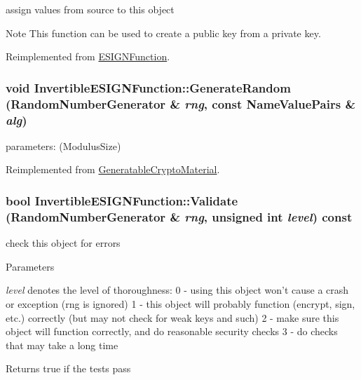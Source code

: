 assign values from source to this object \begin{DoxyNote}{Note}
This function can be used to create a public key from a private key. 
\end{DoxyNote}


Reimplemented from \hyperlink{class_e_s_i_g_n_function_a1ff8229ed7786a13a69d15e5a64e4d21}{ESIGNFunction}.\hypertarget{class_invertible_e_s_i_g_n_function_a241b733193f9f420f188ca6f57d49c27}{
\subsubsection[{GenerateRandom}]{\setlength{\rightskip}{0pt plus 5cm}void InvertibleESIGNFunction::GenerateRandom ({\bf RandomNumberGenerator} \& {\em rng}, \/  const {\bf NameValuePairs} \& {\em alg})}}
\label{class_invertible_e_s_i_g_n_function_a241b733193f9f420f188ca6f57d49c27}
parameters: (ModulusSize) 

Reimplemented from \hyperlink{class_generatable_crypto_material_abe368b52db1ca7079b690f2d6e605f7a}{GeneratableCryptoMaterial}.\hypertarget{class_invertible_e_s_i_g_n_function_a7ff23978311f9f86024f8287d3fd02a8}{
\subsubsection[{Validate}]{\setlength{\rightskip}{0pt plus 5cm}bool InvertibleESIGNFunction::Validate ({\bf RandomNumberGenerator} \& {\em rng}, \/  unsigned int {\em level}) const}}
\label{class_invertible_e_s_i_g_n_function_a7ff23978311f9f86024f8287d3fd02a8}


check this object for errors 
\begin{DoxyParams}{Parameters}
\item[{\em level}]denotes the level of thoroughness: 0 -\/ using this object won't cause a crash or exception (rng is ignored) 1 -\/ this object will probably function (encrypt, sign, etc.) correctly (but may not check for weak keys and such) 2 -\/ make sure this object will function correctly, and do reasonable security checks 3 -\/ do checks that may take a long time \end{DoxyParams}
\begin{DoxyReturn}{Returns}
true if the tests pass 
\end{DoxyReturn}


